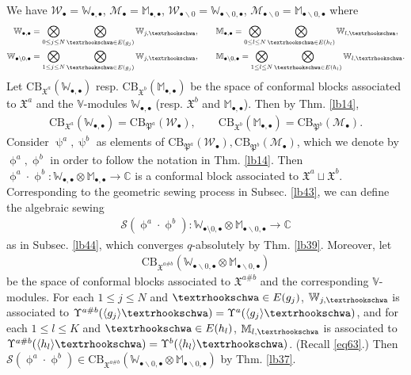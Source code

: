 \documentclass[12pt,a4paper,notitlepage]{article}
\theoremstyle{definition}
\theoremstyle{plain}
\newcommand{\fk}{\mathfrak}
\newcommand{\mc}{\mathcal}
\newcommand{\bk}[1]{\langle {#1}\rangle}
\newcommand{\scr}{\mathscr}
\newcommand{\blt}{\bullet}
\newcommand{\Vbb}{\mathbb V}
\newcommand{\Wbb}{\mathbb W}
\newcommand{\Mbb}{\mathbb M}
\newcommand{\Cbb}{\mathbb C}
\newcommand{\CB}{\mathrm{CB}}
\newcommand{\tipae}{\text{\textrhookschwa}}
\numberwithin{equation}{subsection}
\begin{document}
We have $\mc W_\blt=\Wbb_{\blt,\blt}$, $\mc M_\blt=\Mbb_{\blt,\blt}$, $\mc W_{\blt\backslash0}=\Wbb_{\blt\backslash0,\blt}$, $\mc M_{\blt\backslash0}=\Mbb_{\blt\backslash0,\blt}$ where
\begin{gather*}
\Wbb_{\blt,\blt}=\bigotimes_{0\leq j\leq N}\bigotimes_{\tipae\in E(g_j)}\Wbb_{j,\tipae},\qquad 	\Mbb_{\blt,\blt}=\bigotimes_{0\leq l\leq N}\bigotimes_{\tipae\in E(h_l)}\Wbb_{l,\tipae},\\
\Wbb_{\blt\backslash0,\blt}=\bigotimes_{1\leq j\leq N}\bigotimes_{\tipae\in E(g_j)}\Wbb_{j,\tipae},\qquad 	\Mbb_{\blt\backslash0,\blt}=\bigotimes_{1\leq l\leq N}\bigotimes_{\tipae\in E(h_l)}\Wbb_{l,\tipae}.
\end{gather*}
Let $\CB_{\fk X^a}(\Wbb_{\blt,\blt})$ resp. $\CB_{\fk X^b}(\Mbb_{\blt,\blt})$ be the space of conformal blocks associated to $\fk X^a$ and the $\Vbb$-modules $\Wbb_{\blt,\blt}$ (resp. $\fk X^b$ and $\Mbb_{\blt,\blt}$). Then by Thm. \ref{lb14},
\begin{gather*}
\CB_{\fk X^a}(\Wbb_{\blt,\blt})=\CB_{\fk P^a}(\mc W_\blt),\qquad \CB_{\fk X^b}(\Mbb_{\blt,\blt})=\CB_{\fk P^b}(\mc M_\blt).	
\end{gather*}
Consider $\uppsi^a,\uppsi^b$ as elements of $\CB_{\fk P^a}(\mc W_\blt),\CB_{\fk P^b}(\mc M_\blt)$, which we denote by $\upphi^a,\upphi^b$ in order to follow the notation in Thm. \ref{lb14}. Then $\upphi^a\cdot\upphi^b:\Wbb_{\blt,\blt}\otimes\Mbb_{\blt,\blt}\rightarrow\Cbb$ is a conformal block associated to $\fk X^a\sqcup\fk X^b$. Corresponding to the geometric sewing process in Subsec. \ref{lb43}, we can define the algebraic sewing
\begin{align*}
\scr S(\upphi^a\cdot \upphi^b):\Wbb_{\blt\setminus0,\blt}\otimes\Mbb_{\blt\backslash0,\blt}\rightarrow\Cbb	
\end{align*}
as in Subsec. \ref{lb44}, which converges $q$-absolutely by Thm. \ref{lb39}. Moreover, let
\begin{align*}
\CB_{\fk X^{a\#b}}(\Wbb_{\blt\backslash0,\blt}\otimes\Mbb_{\blt\backslash0,\blt})	
\end{align*}
be the space of conformal blocks associated to $\fk X^{a\#b}$ and the corresponding $\Vbb$-modules. For each $1\leq j\leq N$ and $\tipae\in E(g_j)$,   $\Wbb_{j,\tipae}$ is associated to $\Upsilon^{a\#b}(\bk{g_j}\tipae)=\Upsilon^a(\bk{g_j}\tipae)$, and for each $1\leq l\leq K$ and $\tipae\in E(h_l)$, $\Mbb_{l,\tipae}$ is associated to $\Upsilon^{a\#b}(\bk{h_l}\tipae)=\Upsilon^b(\bk{h_l}\tipae)$. (Recall \eqref{eq63}.) Then $\scr S(\upphi^a\cdot \upphi^b)\in\CB_{\fk X^{a\#b}}(\Wbb_{\blt\backslash0,\blt}\otimes\Mbb_{\blt\backslash0,\blt})$ by Thm. \ref{lb37}.
\end{document}
